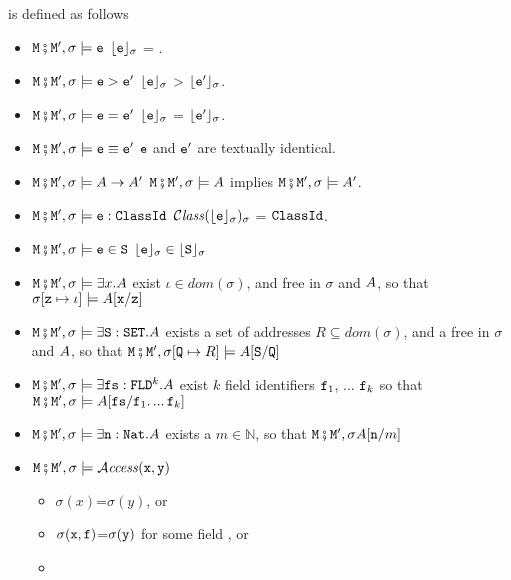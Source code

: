 \begin{definition} is defined  as follows
\label{def:valid:assertion}
\begin{itemize}
\item
$\M\mkpair \M', \sigma \models\SE$ \IFF  $\interp{\SE}{\sigma}$ = .
\item
$\M\mkpair \M', \sigma \models\SE>\SEPrime$ \IFF $\interp{\SE}{\sigma}$ > $\interp{\SEPrime}{\sigma}$.
\item
$\M\mkpair \M', \sigma \models\SE=\SEPrime$ \IFF $\interp{\SE}{\sigma}$ = $\interp{\SEPrime}{\sigma}$.
\item
$\M\mkpair \M', \sigma \models\SE\equiv\SEPrime$ \IFF $\SE$ and $\SEPrime$ are textually identical.
\item
$\M\mkpair \M', \sigma \models\A \rightarrow \A' $ \IFF $\M\mkpair \M', \sigma \models\A$ implies $\M\mkpair \M', \sigma \models\A'$. 
\item
$\M\mkpair \M', \sigma \models \SE:\prg{ClassId}$ \IFF $\ClassOf {\interp{\SE}{\sigma}} {\sigma}$ = $\prg{ClassId}$.
\item
$\M\mkpair \M', \sigma \models \SE\in \prg{S}$ \IFF $\interp{\SE}{\sigma}\in \interp{\prg{S}}{\sigma}$
\item
$\M\mkpair \M', \sigma \models \exists x.\A$ \IFF  exist  $\iota\in dom(\sigma)$, and    free in $\sigma$ and $\A$, so that
$\sigma[\prg{z}\mapsto \iota] \models  \A[\prg{x}/\prg{z}]$ 
\item
$\M\mkpair \M', \sigma \models \exists \prg{S}:\prg{SET}.\A$ \IFF  exists a set of addresses $R\subseteq dom(\sigma)$, and a  free in $\sigma$ and $\A$, so that
$\M\mkpair \M', \sigma[\prg{Q}\mapsto R] \models  \A[\prg{S}/\prg{Q}]$ 
\item
$\M\mkpair \M', \sigma \models  \exists \prg{fs}:\prg{FLD}^k.\A$ \IFF  exist $k$ field identifiers $\prg{f}_1$, ... $\prg{f}_k$ so that 
$\M\mkpair \M', \sigma \models  \A[\prg{fs}/\prg{f}_1.\,...\,\prg{f}_k]$ 
\item
$\M\mkpair \M', \sigma \models  \exists \prg{n}:\prg{Nat}.\A$ \IFF  exists a $m\in\mathbb{N}$, so that $\M\mkpair \M', \sigma \A[\prg{n}/m]$ 
\item
$\M\mkpair \M', \sigma \models  \CanAccess{\prg{x}}{\prg{y}}$   \IFF  \begin{itemize}
\item
$\sigma(x)$=$\sigma(y)$, or
\item
$\sigma(\prg{x},\prg{f})$=$\sigma(\prg{y})$  for some field ,  or
\item

\end{itemize}
\end{itemize}
\end{definition}

